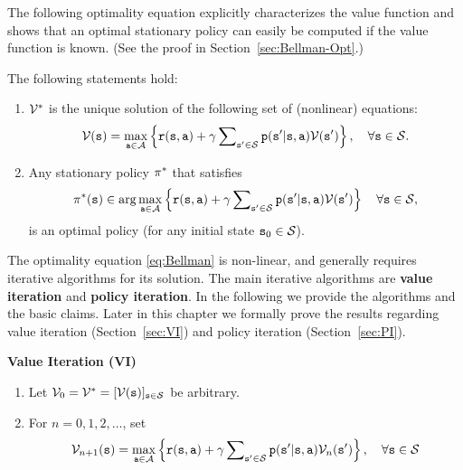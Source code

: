 The following optimality equation explicitly characterizes the value function
and shows that an optimal stationary policy can easily be computed if the value function is
known. (See the proof in Section~\ref{sec:Bellman-Opt}.)

\begin{theorem}\label{thm:inf_Bellman} The following statements hold:
\begin{enumerate}
  \item $\mathcal{V}_{}^*$ is the unique solution of the following set of (nonlinear) equations:
\begin{equation}\label{eq:Bellman}
\mathcal{V}({\tt s}) = \mathop {\max }\limits_{{\tt a} \in \mathcal{A}}
\left\{ {{\tt r}({\tt s},{\tt a}) + \gamma \sum\nolimits_{{\tt s}'
\in \mathcal{S}} {{\tt p}({\tt s}'|{\tt s},{\tt a})\mathcal{V}({\tt s}')} } \right\},
\quad \forall {\tt s} \in \mathcal{S}.
\end{equation}
  \item Any stationary policy ${\pi ^*}$ that satisfies
\[{\pi ^*}({\tt s}) \in \arg {\max _{{\tt a}\in \mathcal{A}}}\left\{ {{\tt r}({\tt s},{\tt a}) + \gamma \sum\nolimits_{{\tt s}' \in \mathcal{S}} {{\tt p}({\tt s}'|{\tt s},{\tt a})\mathcal{V}({\tt s}')} } \right\} \quad \forall {\tt s} \in \mathcal{S}, \]
     is an optimal policy (for any initial state ${{\tt s}_0} \in \mathcal{S}$).
\end{enumerate}
\end{theorem}
The optimality equation \eqref{eq:Bellman} is non-linear, and
generally requires iterative algorithms for its solution. The main
iterative algorithms are \textbf{value iteration} and \textbf{policy
iteration}. In the following we provide the algorithms and the basic
claims. Later in this chapter we formally prove the results
regarding value iteration (Section~\ref{sec:VI}) and policy
iteration (Section~\ref{sec:PI}).


\begin{algorithm_}\textbf{Value Iteration (VI)}\label{alg:VI}
\begin{enumerate}
  \item Let ${\mathcal{V}_0} = {\mathcal{V}^*} = {[\mathcal{V}({\tt s})]_{{\tt s} \in \mathcal{S}}}$ be arbitrary.
  \item For $n = 0,1,2, \ldots $, set
\[{\mathcal{V}_{n + 1}}({\tt s}) = \mathop {\max }\limits_{{\tt a} \in \mathcal{A}} \left\{ {{\tt r}({\tt s},{\tt a}) + \gamma \sum\nolimits_{{\tt s}' \in \mathcal{S}} {{\tt p}({\tt s}'|{\tt s},{\tt a}){\mathcal{V}_n}({\tt s}')} } \right\},    \quad \forall {\tt s} \in \mathcal{S}\]
\end{enumerate}
\end{algorithm_}

